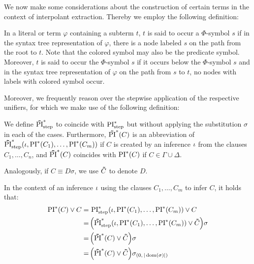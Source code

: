 We now make some considerations about the construction of certain terms in the context of interpolant extraction.
Thereby we employ the following definition:

\begin{defi}
In a literal or term $\varphi$ containing a subterm $t$, $t$ is said to occur  a $\Phi$-symbol $s$ if in the syntax tree representation of $\varphi$, there is a node labeled $s$ on the path from the root to $t$. Note that the colored symbol may also be the predicate symbol.
Moreover, $t$ is said to occur  the $\Phi$-symbol $s$ if it occurs below the $\Phi$-symbol $s$ and in the syntax tree representation of $\varphi$ on the path from $s$ to $t$, no nodes with labels with colored symbol occur.
\end{defi}



Moreover, we frequently reason over the stepwise application of the respective unifiers, for which we make use of the following definition:

\begin{defi}
	We define $\bm\tilde{\operatorname{PI}}^{*}_{\mathrm{step}}$ to coincide with $\operatorname{PI}_{\mathrm{step}}^*$ but without applying the substitution $\sigma$ in each of the cases.
	Furthermore, $\bm\tilde{\operatorname{PI}}^{*}(C)$ is an abbreviation of $\bm\tilde{\operatorname{PI}}^{*}_{\mathrm{step}}(\iota, \operatorname{PI}^*(C_1), \dots, \operatorname{PI}^*(C_m))$ if $C$ is created by an inference $\iota$ from the clauses $C_1, \dots, C_n$,
	and $\bm\tilde{\operatorname{PI}}^{*}(C)$ coincides with $\operatorname{PI}^*(C)$ if $C\in \Gamma\cup\Delta$.

	Analogously, if $C \equiv D\sigma$, we use $\bm\tilde{C}$ to denote\nolinebreak{} $D$.
\end{defi}

In the context of an inference $\iota$ using the clauses $C_1, \dots, C_m$ to infer $C$, it holds that:
\begin{align*}
	 \operatorname{PI}^*(C) \lor C 
	 =\,& \operatorname{PI}_{\mathrm{step}}^*(\iota, \operatorname{PI}^*(C_1), \dots, \operatorname{PI}^*(C_m)) \lor C  \\
	=\, & \Big(\bm\tilde{\operatorname{PI}}^{*}_{\mathrm{step}}(\iota, \operatorname{PI}^*(C_1), \dots, \operatorname{PI}^*(C_m)) \lor \bm\tilde{C} \Big) \sigma  \\
	=\, & \Big(\bm\tilde{\operatorname{PI}}^{*}(C)\lor \bm\tilde{C} \Big) \sigma  \\
	=\,& \Big(\bm\tilde{\operatorname{PI}}^{*}(C)\lor \bm\tilde{C} \Big) \sigma_{(0,\,|\operatorname{dom}(\sigma)|)}
\end{align*}


\newcommand{\inv}{\ensuremath{\PIstarnosigma(C)\lor \nosigma{C}}}
\newcommand{\invp}{\ensuremath{(\inv)}}


